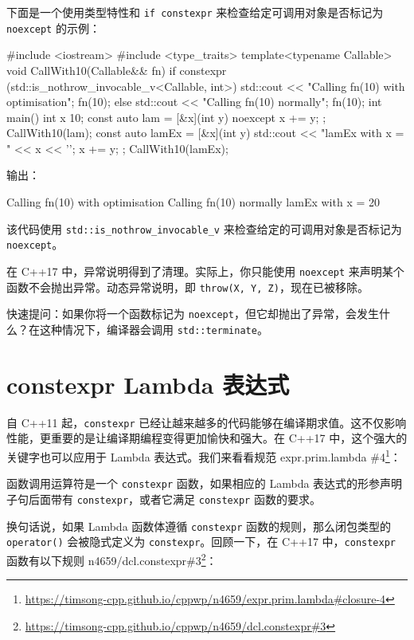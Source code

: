 下面是一个使用类型特性和 \texttt{if constexpr} 来检查给定可调用对象是否标记为 \texttt{noexcept} 的示例：

\begin{codebox}
#include <iostream>
#include <type_traits>
template<typename Callable>
void CallWith10(Callable&& fn) {
if constexpr (std::is_nothrow_invocable_v<Callable, int>) {
std::cout << "Calling fn(10) with optimisation\n";
fn(10);
}
else {
std::cout << "Calling fn(10) normally\n";
fn(10);
}
}
int main() {
int x {10};
const auto lam = [&x](int y) noexcept { x += y; };
CallWith10(lam);
const auto lamEx = [&x](int y) {
std::cout << "lamEx with x = " << x << '\n';
x += y;
};
CallWith10(lamEx);
}
\end{codebox}

输出：

\begin{codebox}
Calling fn(10) with optimisation
Calling fn(10) normally
lamEx with x = 20
\end{codebox}

该代码使用 \texttt{std::is\_nothrow\_invocable\_v} 来检查给定的可调用对象是否标记为 \texttt{noexcept}。


在 C++17 中，异常说明得到了清理。实际上，你只能使用 \texttt{noexcept} 来声明某个函数不会抛出异常。动态异常说明，即 \texttt{throw(X, Y, Z)}，现在已被移除。


快速提问：如果你将一个函数标记为 \texttt{noexcept}，但它却抛出了异常，会发生什么？在这种情况下，编译器会调用 \texttt{std::terminate}。

\section{constexpr Lambda 表达式}

自 C++11 起，\texttt{constexpr} 已经让越来越多的代码能够在编译期求值。这不仅影响性能，更重要的是让编译期编程变得更加愉快和强大。在 C++17 中，这个强大的关键字也可以应用于 Lambda 表达式。我们来看看规范 expr.prim.lambda \#4\footnote{\url{https://timsong-cpp.github.io/cppwp/n4659/expr.prim.lambda\#closure-4}}：

函数调用运算符是一个 \texttt{constexpr} 函数，如果相应的 Lambda 表达式的形参声明子句后面带有 \texttt{constexpr}，或者它满足 \texttt{constexpr} 函数的要求。

换句话说，如果 Lambda 函数体遵循 \texttt{constexpr} 函数的规则，那么闭包类型的 \texttt{operator()} 会被隐式定义为 \texttt{constexpr}。回顾一下，在 C++17 中，\texttt{constexpr} 函数有以下规则 n4659/dcl.constexpr\#3\footnote{\url{https://timsong-cpp.github.io/cppwp/n4659/dcl.constexpr\#3}}：

